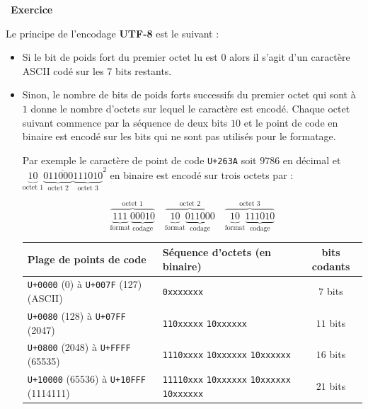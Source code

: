 \documentclass[a4paper, french, 12pt]{article}  %
\newcounter{exo}
\newenvironment{exercice}[1]
{\par \medskip   \addtocounter{exo}{1} \noindent  
\begin{bclogo}[arrondi =0.1,   noborder = true, logo=\bccrayon, marge=4]{~\textbf{Exercice} \textbf{\theexo} {\itshape #1} }  \par}
{
\end{bclogo}
 \par \bigskip }
\begin{document}
\vspace*{-20pt}

\begin{exercice}{}

Le principe de l'encodage \textbf{UTF-8} est le suivant :

\begin{itemize}
	\item Si le bit de poids fort du premier octet lu est $0$ alors il s'agit d'un caractère ASCII codé sur les 7 bits restants. 
	\item Sinon, le nombre de bits de poids forts successifs du premier octet qui sont à $1$ donne le nombre d'octets sur lequel le caractère est encodé. Chaque octet suivant commence par la séquence de deux bits $10$ et le point de code en binaire est encodé sur les bits qui ne sont pas utilisés pour le formatage. 
	
Par exemple le caractère de point de code \texttt{U+263A} soit $9786$ en décimal et $\overline{\underbrace{10}_{\text{octet }1}\underbrace{011000}_{\text{octet }2}\underbrace{111010}_{\text{octet }3}}^{2}$ en binaire est encodé sur trois octets par :

\begin{equation*}
\overbrace{\underbrace{111}_{\text{format}}\underbrace{00010}_{\text{codage}}}^{\text{octet 1}}   \quad  \overbrace{\underbrace{10}_{\text{format}}\underbrace{011000}_{\text{codage}}}^{\text{octet 2}}  \quad   \overbrace{\underbrace{10}_{\text{format}}\underbrace{111010}_{\text{codage}}}^{\text{octet 3}}
\end{equation*}


\begin{tabular}{|l|l|c|}
\hline 
Plage de points de code & Séquence d'octets (en binaire)  & bits codants \\ 
\hline 
\texttt{U+0000} (0) à \texttt{U+007F} (127) (ASCII) & \texttt{0xxxxxxx} & $7$ bits \\ 
\hline 
\texttt{U+0080} (128) à \texttt{U+07FF} (2047)  & \texttt{110xxxxx} \texttt{10xxxxxx} & $11$ bits \\ 
\hline 
\texttt{U+0800} (2048) à \texttt{U+FFFF} (65535) & \texttt{1110xxxx} \texttt{10xxxxxx} \texttt{10xxxxxx} & $16$ bits \\ 
\hline 
\texttt{U+10000} (65536) à \texttt{U+10FFF} (1114111)  & \texttt{11110xxx} \texttt{10xxxxxx}  \texttt{10xxxxxx} \texttt{10xxxxxx}  & $21$ bits \\ 
\hline 
\end{tabular} 
\end{itemize}


\end{exercice}
\end{document}
